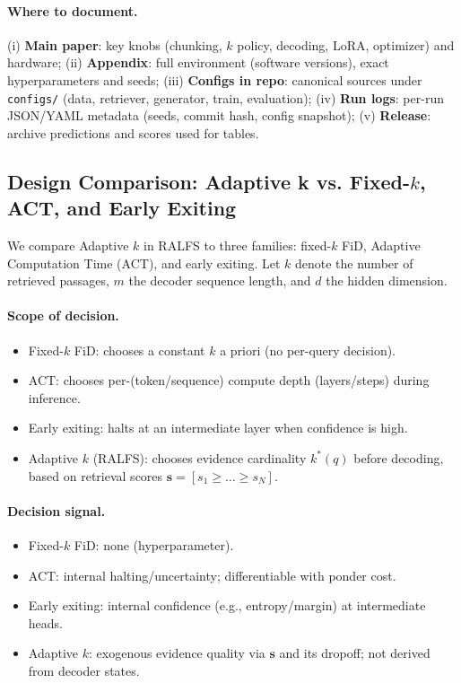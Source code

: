 \documentclass[11pt,a4paper]{article}
\begin{document}
\paragraph{Where to document.} (i) \textbf{Main paper}: key knobs (chunking, $k$ policy, decoding, LoRA, optimizer) and hardware; (ii) \textbf{Appendix}: full environment (software versions), exact hyperparameters and seeds; (iii) \textbf{Configs in repo}: canonical sources under \texttt{configs/} (data, retriever, generator, train, evaluation); (iv) \textbf{Run logs}: per-run JSON/YAML metadata (seeds, commit hash, config snapshot); (v) \textbf{Release}: archive predictions and scores used for tables.

\subsection{Design Comparison: Adaptive k vs. Fixed-$k$, ACT, and Early Exiting}

We compare Adaptive $k$ in RALFS to three families: fixed-$k$ FiD, Adaptive Computation Time (ACT), and early exiting. Let $k$ denote the number of retrieved passages, $m$ the decoder sequence length, and $d$ the hidden dimension.

\paragraph{Scope of decision.}
\begin{itemize}
	\item Fixed-$k$ FiD: chooses a constant $k$ a priori (no per-query decision).
	\item ACT: chooses per-(token/sequence) compute depth (layers/steps) during inference.
	\item Early exiting: halts at an intermediate layer when confidence is high.
	\item Adaptive $k$ (RALFS): chooses evidence cardinality $k^*(q)$ before decoding, based on retrieval scores $\mathbf{s}=[s_1\!\ge\!\dots\!\ge\!s_N]$.
\end{itemize}

\paragraph{Decision signal.}
\begin{itemize}
	\item Fixed-$k$ FiD: none (hyperparameter).
	\item ACT: internal halting/uncertainty; differentiable with ponder cost.
	\item Early exiting: internal confidence (e.g., entropy/margin) at intermediate heads.
	\item Adaptive $k$: exogenous evidence quality via $\mathbf{s}$ and its dropoff; not derived from decoder states.
\end{itemize}
\end{document}
